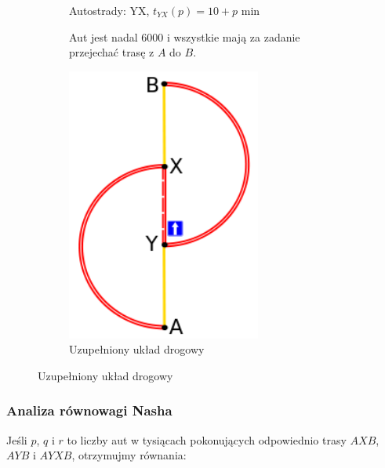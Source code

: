 \documentclass[twoside,12pt]{report}
\begin{document}
\vspace*{60px}
\begin{figure}[h]
\begin{flushleft}
	\begin{subfigure}{.50\textwidth}
	Autostrady:\newline
	YX, $t_{YX}(p) =  10 + p$ min\newline
	
	\vspace*{15px}
	Aut jest nadal 6000 i wszystkie mają za zadanie przejechać trasę z $A$ do $B$.
	\end{subfigure}%
\end{flushleft}
\begin{flushright}
	\begin{subfigure}{.50\textwidth}
	\centering
	\includegraphics[width=0.7\textwidth]{img/braess2}
	\caption{Uzupełniony układ drogowy}
	\end{subfigure}
\end{flushright}
\end{figure}

\subsubsection{Analiza równowagi Nasha}

Jeśli $p$, $q$ i $r$ to liczby aut w tysiącach pokonujących odpowiednio trasy $AXB$, $AYB$ i $AYXB$, otrzymujmy równania:
\end{document}

